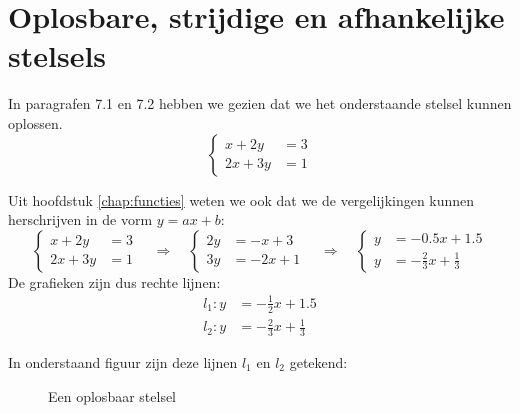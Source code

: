\newpage
\section{Oplosbare, strijdige en afhankelijke stelsels}
In paragrafen 7.1 en 7.2 hebben we gezien dat we het onderstaande stelsel kunnen oplossen. \\
\[
\begin{cases}
    x+2y&=3\\
    2x+3y&=1
\end{cases}
\]

Uit hoofdstuk \ref{chap:functies} weten we ook dat we de vergelijkingen kunnen herschrijven in de vorm $y=ax+b$:
\[
\begin{cases}
    x+2y&=3 \\
    2x+3y&=1
\end{cases} \quad \Rightarrow \quad 
\begin{cases}
    2y&=-x+3\\
    3y&=-2x+1
\end{cases} \quad \Rightarrow \quad
\begin{cases}
    y&=-0.5x+1.5 \\
    y&=-\frac{2}{3} x+\frac{1}{3}
\end{cases}
\]
De grafieken zijn dus rechte lijnen:
\begin{align*}
    l_1: y&=-\frac{1}{2}x+1.5 \\
    l_2: y&=-\frac{2}{3} x+\frac{1}{3}
\end{align*}

In onderstaand figuur zijn deze lijnen $l_1$ en $l_2$ getekend:

\begin{figure}[H]
    \centering
    \caption{Een oplosbaar stelsel}
    \label{fig:oplosbaar}
\end{figure}


